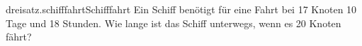 \begin{exercise}{dreisatz.schifffahrt}{Schifffahrt}
  \ifproblem\problem
    Ein Schiff benötigt für eine Fahrt bei 17 Knoten 10 Tage und 18 Stunden.
    Wie lange ist das Schiff unterwegs, wenn es 20 Knoten fährt?
  \fi
\end{exercise}
